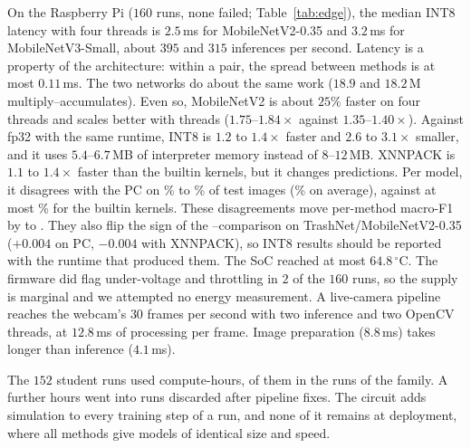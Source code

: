 On the Raspberry Pi ($160$ runs, none failed; Table~\ref{tab:edge}), the median INT8 latency with four threads is $2.5$\,ms for MobileNetV2-0.35 and $3.2$\,ms for MobileNetV3-Small, about $395$ and $315$ inferences per second.
Latency is a property of the architecture: within a pair, the spread between methods is at most $0.11$\,ms.
The two networks do about the same work ($18.9$ and $18.2$\,M multiply--accumulates). Even so, MobileNetV2 is about $25\%$ faster on four threads and scales better with threads ($1.75$--$1.84\times$ against $1.35$--$1.40\times$).
Against fp32 with the same runtime, INT8 is $1.2$ to $1.4\times$ faster and $2.6$ to $3.1\times$ smaller, and it uses $5.4$--$6.7$\,MB of interpreter memory instead of $8$--$12$\,MB.
XNNPACK is $1.1$ to $1.4\times$ faster than the builtin kernels, but it changes predictions. Per model, it disagrees with the PC on \XnnDisMin{}\% to \XnnDisMax{}\% of test images (\XnnDisMean{}\% on average), against at most \BuiltinDisMax{}\% for the builtin kernels.
These disagreements move per-method macro-F1 by \XnnVsPcMin{} to \XnnVsPcMax{}. They also flip the sign of the \Pqk--\Kd comparison on TrashNet/MobileNetV2-0.35 ($+0.004$ on PC, $-0.004$ with XNNPACK), so INT8 results should be reported with the runtime that produced them.
The SoC reached at most $64.8\,^\circ$C. The firmware did flag under-voltage and throttling in $2$ of the $160$ runs, so the supply is marginal and we attempted no energy measurement.
A live-camera pipeline reaches the webcam's $30$ frames per second with two inference and two OpenCV threads, at $12.8$\,ms of processing per frame. Image preparation ($8.8$\,ms) takes longer than inference ($4.1$\,ms).

The $152$ student runs used \CostKeptHours{} compute-hours, \CostPqkHours{} of them in the \CostPqkRuns{} runs of the \Pqk family. A further \CostDiscardedHours{} hours went into runs discarded after pipeline fixes.
The circuit adds simulation to every training step of a \Pqk run, and none of it remains at deployment, where all methods give models of identical size and speed.
